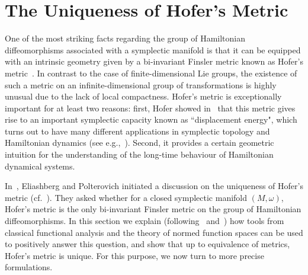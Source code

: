 \documentclass{icmart}
\theoremstyle{definition}
\begin{document}
\section{The Uniqueness of Hofer's Metric} \label{SEC:HOFER}

One of the most striking facts regarding %
the group of Hamiltonian diffeomorphisms associated with  a symplectic manifold is that it can be
equipped with an intrinsic geometry given by a bi-invariant Finsler metric known as
Hofer's metric~\cite{H}. In contrast to the case of finite-dimensional Lie groups, the existence of such
a metric on an infinite-dimensional group of transformations is highly unusual due to
the lack of local  compactness.
Hofer's metric is exceptionally important for at least two reasons: first, Hofer showed in~\cite{H} that this metric 
gives rise to an important symplectic capacity known as  ``displacement energy", which turns out to have many different applications in symplectic topology and Hamiltonian dynamics (see e.g.,~\cite{Chek,H,HZ, L,LM,P,P1}). Second, it provides a certain geometric intuition for
the understanding of the long-time behaviour of Hamiltonian dynamical systems.

\smallskip

In~\cite{EliP}, Eliashberg and Polterovich initiated a discussion on the uniqueness of Hofer's metric
(cf.~\cite{Eli,P1}). They asked whether for a closed symplectic manifold $(M,\omega)$, Hofer's metric is the only 
 bi-invariant Finsler metric on the group  of Hamiltonian diffeomorphisms. %
In this section we explain  (following~\cite{OW} and~\cite{BO}) how tools from  classical functional analysis and the theory of normed function spaces  can be used to  positively  answer this question, and show that up to equivalence of metrics, Hofer's metric is unique. 
For this purpose, we now turn to more precise
formulations.


 
\end{document}
